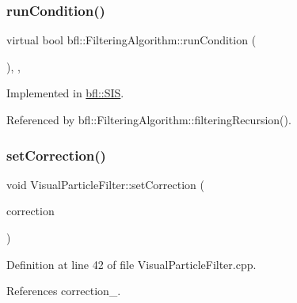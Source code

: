 \subsubsection{\texorpdfstring{run\+Condition()}{runCondition()}}
{\footnotesize\ttfamily virtual bool bfl\+::\+Filtering\+Algorithm\+::run\+Condition (\begin{DoxyParamCaption}{ }\end{DoxyParamCaption})\hspace{0.3cm}{\ttfamily [protected]}, {}, {\ttfamily [inherited]}}



Implemented in \mbox{\hyperlink{classbfl_1_1SIS_afb7cff1f7dae80e0e4ca84c925ca3ac3}{bfl\+::\+S\+IS}}.



Referenced by bfl\+::\+Filtering\+Algorithm\+::filtering\+Recursion().

\mbox{\label{classbfl_1_1VisualParticleFilter_a77d03652f07d323b35aa478b0327b2f7}} 
\subsubsection{\texorpdfstring{set\+Correction()}{setCorrection()}}
{\footnotesize\ttfamily void Visual\+Particle\+Filter\+::set\+Correction (\begin{DoxyParamCaption}\item[{std\+::unique\+\_\+ptr$<$ \mbox{\hyperlink{classbfl_1_1PFVisualCorrection}{P\+F\+Visual\+Correction}} $>$}]{correction }\end{DoxyParamCaption})}



Definition at line 42 of file Visual\+Particle\+Filter.\+cpp.



References correction\+\_\+.

\mbox{\label{classbfl_1_1VisualParticleFilter_ac254d164f51ddbef8c79f8f1a7863a8d}} 
